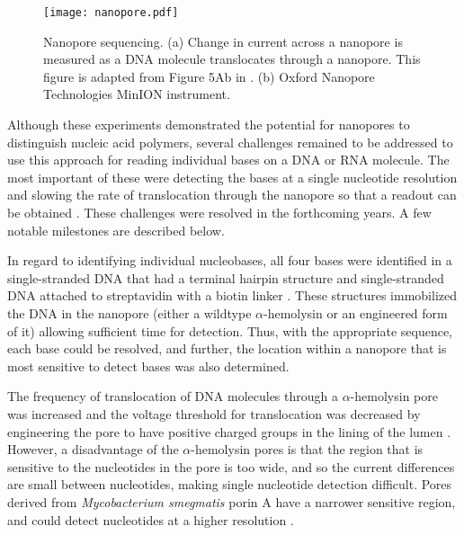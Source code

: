 \begin{figure}[b!]
\centering
\texttt{[image: nanopore.pdf]}
\caption[Nanopore sequencing]{
  Nanopore sequencing.
  (a) Change in current across a nanopore is measured as a DNA molecule
  translocates through a nanopore. This figure is
  adapted from Figure 5Ab in \cite{goodwin2016coming}.
  (b) Oxford Nanopore Technologies MinION instrument.}
\label{nanopore}
\end{figure}

Although these experiments demonstrated the potential for nanopores to
distinguish nucleic acid polymers, several challenges remained to be
addressed to use this approach for reading individual bases on a DNA or
RNA molecule.
%
The most important of these were detecting the bases at a single
nucleotide resolution and slowing the rate of translocation through the
nanopore so that a readout can be obtained
\citep{bayley2015nanopore,branton2010potential}.
%
These challenges were resolved in the forthcoming years. A few notable
milestones are described below.

In regard to identifying individual nucleobases, all four bases were
identified in a single-stranded DNA that had a terminal hairpin
structure \citep{ashkenasy2005recognizing} and single-stranded DNA
attached to streptavidin with a biotin linker
\citep{purnell2009discrimination,stoddart2009single}. These structures
immobilized the DNA in the nanopore (either a wildtype
$\alpha$-hemolysin or an engineered form of it) allowing sufficient time
for detection. Thus, with the appropriate sequence, each base could be
resolved, and further, the location within a nanopore that is most
sensitive to detect bases was also determined.


The frequency of translocation of DNA molecules through a
$\alpha$-hemolysin pore was increased and the voltage threshold for
translocation was decreased by engineering the pore to have positive
charged groups in the lining of the lumen \citep{maglia2008enhanced}.
%
However, a disadvantage of the $\alpha$-hemolysin pores is that the
region that is sensitive to the nucleotides in the pore is too wide, and
so the current differences are small between nucleotides, making single
nucleotide detection difficult.
%
Pores derived from \emph{Mycobacterium smegmatis} porin A have a
narrower sensitive region, and could detect nucleotides at a higher
resolution \citep{butler2008single,manrao2011nucleotide}.

